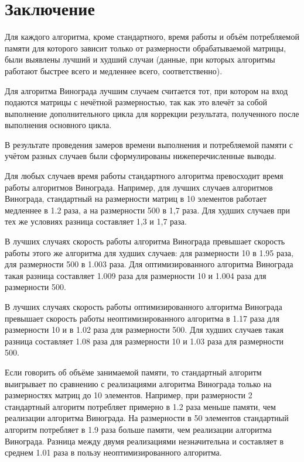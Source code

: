 \chapter*{Заключение}
Для каждого алгоритма, кроме стандартного, время работы и объём потребляемой памяти для которого зависит только от размерности обрабатываемой матрицы, были выявлены лучший и худший случаи (данные, при которых алгоритмы работают быстрее всего и медленнее всего, соответственно). 

Для алгоритма Винограда лучшим случаем считается тот, при котором на вход подаются матрицы с нечётной размерностью, так как это влечёт за собой выполнение дополнительного цикла для коррекции результата, полученного после выполнения основного цикла.

В результате проведения замеров времени выполнения и потребляемой памяти с учётом разных случаев были сформулированы нижеперечисленные выводы.

Для любых случаев время работы стандартного алгоритма превосходит время работы алгоритмов Винограда. Например, для лучших случаев алгоритмов Винограда, стандартный на размерности матриц в 10 элементов работает медленнее в 1.2 раза, а на размерности 500 в 1,7 раза. Для худших случаев при тех же условиях разница составляет 1,3 и 1,7 раза.

В лучших случаях скорость работы алгоритма Винограда превышает скорость работы этого же алгоритма для худших случаев: для размерности 10 в 1.95 раза, для размерности 500 в 1.003 раза. Для оптимизированного алгоритма Винограда такая разница составляет 1.009 раза для размерности 10 и 1.004 раза для размерности 500.

В лучших случаях скорость работы оптимизированного алгоритма Винограда превышает скорость работы неоптимизированного алгоритма в 1.17 раза для размерности 10 и в 1.02 раза для размерности 500. Для худших случаев такая разница составляет 1.08 раза для размерности 10 и 1.03 раза для размерности 500.

Если говорить об объёме занимаемой памяти, то стандартный алгоритм выигрывает по сравнению с реализациями алгоритма Винограда только на размерностях матриц до 10 элементов. Например, при размерности 2 стандартный алгоритм потребляет примерно в 1.2 раза меньше памяти, чем реализации алгоритма Винограда. На размерности в 50 элементов стандартный алгоритм потребляет в 1.9 раза больше памяти, чем реализации алгоритма Винограда. Разница между двумя реализациями незначительна и составляет в среднем 1.01 раза в пользу неоптимизированного алгоритма.

